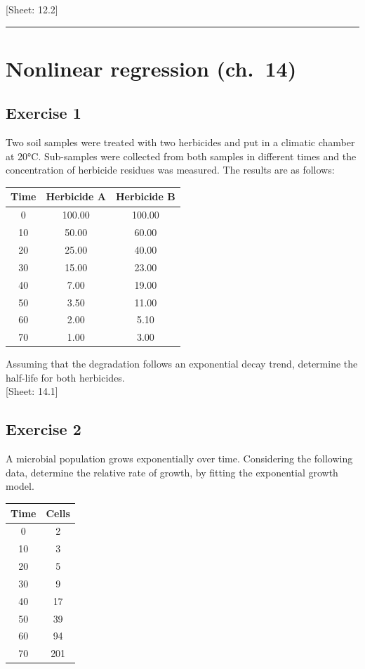 \documentclass[a4paper,12pt,oneside]{book}
\begin{document}
{[}Sheet: 12.2{]}

\begin{center}\rule{0.5\linewidth}{0.5pt}\end{center}

\hypertarget{nonlinear-regression-ch.-14}{%
\section{Nonlinear regression (ch.~14)}\label{nonlinear-regression-ch.-14}}

\hypertarget{exercise-1-8}{%
\subsection{Exercise 1}\label{exercise-1-8}}

Two soil samples were treated with two herbicides and put in a climatic chamber at 20°C. Sub-samples were collected from both samples in different times and the concentration of herbicide residues was measured. The results are as follows:

\begin{longtable}[]{@{}ccc@{}}
\toprule
Time & Herbicide A & Herbicide B \\
\midrule
\endhead
0 & 100.00 & 100.00 \\
10 & 50.00 & 60.00 \\
20 & 25.00 & 40.00 \\
30 & 15.00 & 23.00 \\
40 & 7.00 & 19.00 \\
50 & 3.50 & 11.00 \\
60 & 2.00 & 5.10 \\
70 & 1.00 & 3.00 \\
\bottomrule
\end{longtable}

Assuming that the degradation follows an exponential decay trend, determine the half-life for both herbicides.\\
{[}Sheet: 14.1{]}

\hypertarget{exercise-2-9}{%
\subsection{Exercise 2}\label{exercise-2-9}}

A microbial population grows exponentially over time. Considering the following data, determine the relative rate of growth, by fitting the exponential growth model.

\begin{longtable}[]{@{}cc@{}}
\toprule
Time & Cells \\
\midrule
\endhead
0 & 2 \\
10 & 3 \\
20 & 5 \\
30 & 9 \\
40 & 17 \\
50 & 39 \\
60 & 94 \\
70 & 201 \\
\bottomrule
\end{longtable}
\end{document}
